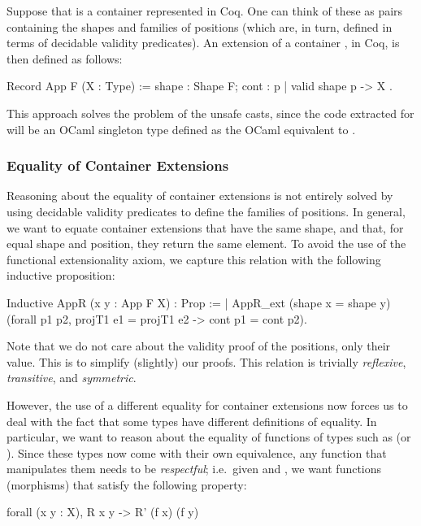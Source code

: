 \documentclass{llncs}
\begin{document}
Suppose that  is a container represented in Coq. One can think of these
 as pairs containing the shapes and families of positions (which are, in
turn, defined in terms of decidable validity predicates).
An extension of a container ,  in Coq, is then defined as
follows:
\begin{coqcode}
Record App F (X : Type)
   := { shape : Shape F; cont : {p | valid shape p} -> X }.
\end{coqcode}

This approach solves the problem of the unsafe casts, since the code extracted
for  will be an OCaml singleton type defined as the
OCaml equivalent to .

\subsubsection{Equality of Container Extensions}
Reasoning about the equality of container extensions is not entirely solved by
using decidable validity predicates to define the families of positions. In
general, we want to equate container extensions that have the same shape, and
that, for equal shape and position, they return the same element. To avoid the
use of the functional extensionality axiom, we capture this relation with the
following inductive proposition:
\begin{coqcode}
Inductive AppR (x y : App F X) : Prop :=
| AppR_ext (shape x = shape y)
           (forall p1 p2, projT1 e1 = projT1 e2 -> cont p1 = cont p2).
\end{coqcode}
Note that we do not care about the validity proof of the positions, only their
value. This is to simplify (slightly) our proofs. This relation is trivially
\emph{reflexive}, \emph{transitive}, and \emph{symmetric}.

However, the use of a different equality for container extensions now forces us
to deal with the fact that some types have different definitions of equality.
In particular, we want to reason about the equality of functions of types such
as  (or ).
%
Since these types now come with their own equivalence, any function that
manipulates them needs to be \emph{respectful}; i.e.\ given
 and ,
we want functions (morphisms) that satisfy the following property:
\begin{coqcode}
forall (x y : X), R x y -> R' (f x) (f y)
\end{coqcode}
\end{document}
